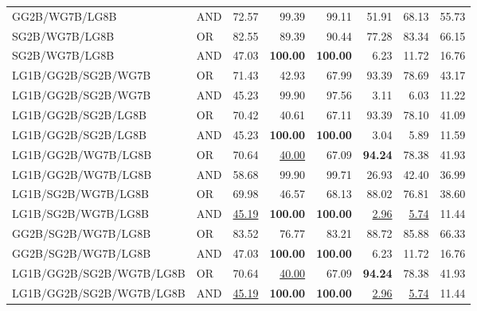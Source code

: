 \documentclass{article}
\begin{document}
{\begin{longtable}{llrrrrrr}
 GG2B/WG7B/LG8B           & AND     & 72.57             & 99.39             & 99.11             & 51.91            & 68.13            & 55.73            \\
 SG2B/WG7B/LG8B           & OR      & 82.55             & 89.39             & 90.44             & 77.28            & 83.34            & 66.15            \\
 SG2B/WG7B/LG8B           & AND     & 47.03             & \textbf{100.00}   & \textbf{100.00}   & 6.23             & 11.72            & 16.76            \\
 LG1B/GG2B/SG2B/WG7B      & OR      & 71.43             & 42.93             & 67.99             & 93.39            & 78.69            & 43.17            \\
 LG1B/GG2B/SG2B/WG7B      & AND     & 45.23             & 99.90             & 97.56             & 3.11             & 6.03             & 11.22            \\
 LG1B/GG2B/SG2B/LG8B      & OR      & 70.42             & 40.61             & 67.11             & 93.39            & 78.10            & 41.09            \\
 LG1B/GG2B/SG2B/LG8B      & AND     & 45.23             & \textbf{100.00}   & \textbf{100.00}   & 3.04             & 5.89             & 11.59            \\
 LG1B/GG2B/WG7B/LG8B      & OR      & 70.64             & \underline{40.00} & 67.09             & \textbf{94.24}   & 78.38            & 41.93            \\
 LG1B/GG2B/WG7B/LG8B      & AND     & 58.68             & 99.90             & 99.71             & 26.93            & 42.40            & 36.99            \\
 LG1B/SG2B/WG7B/LG8B      & OR      & 69.98             & 46.57             & 68.13             & 88.02            & 76.81            & 38.60            \\
 LG1B/SG2B/WG7B/LG8B      & AND     & \underline{45.19} & \textbf{100.00}   & \textbf{100.00}   & \underline{2.96} & \underline{5.74} & 11.44            \\
 GG2B/SG2B/WG7B/LG8B      & OR      & 83.52             & 76.77             & 83.21             & 88.72            & 85.88            & 66.33            \\
 GG2B/SG2B/WG7B/LG8B      & AND     & 47.03             & \textbf{100.00}   & \textbf{100.00}   & 6.23             & 11.72            & 16.76            \\
 LG1B/GG2B/SG2B/WG7B/LG8B & OR      & 70.64             & \underline{40.00} & 67.09             & \textbf{94.24}   & 78.38            & 41.93            \\
 LG1B/GG2B/SG2B/WG7B/LG8B & AND     & \underline{45.19} & \textbf{100.00}   & \textbf{100.00}   & \underline{2.96} & \underline{5.74} & 11.44            \\

\end{longtable}
}
\end{document}
